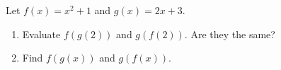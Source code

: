 Let $f(x)=x^2+1$ and $g(x)=2x+3$.
\begin{enumerate}
\item[(a)] Evaluate $f(g(2))$ and $g(f(2))$. Are they the same?
\item[(b)] Find $f(g(x))$ and $g(f(x))$.
\end{enumerate}
